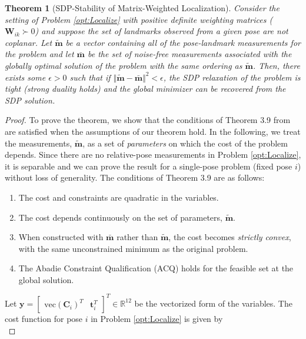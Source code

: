 \documentclass[lettersize,journal]{IEEEtran}
\newcommand{\vect}[1]{\mbox{vec}(#1)}
\newtheorem{theorem}{Theorem}
\begin{document}
\begin{theorem}[SDP-Stability of Matrix-Weighted Localization]
Consider the setting of Problem \eqref{opt:Localize} with positive definite weighting matrices ($ \bm{W}_{ik} \succ 0$) and suppose the set of landmarks observed from a given pose are not coplanar. Let $\tilde{\bm{m}}$ be a vector containing all of the pose-landmark measurements for the problem and let $\bar{\bm{m}}$ be the set of noise-free measurements associated with the globally optimal solution of the problem with the same ordering as $\tilde{\bm{m}}$. Then, there exists some $\epsilon > 0$ such that if $\Vert \tilde{\bm{m}} - \bar{\bm{m}} \Vert^2 < \epsilon $, the SDP relaxation of the problem is tight (strong duality holds) and the global minimizer can be recovered from the SDP solution.
\end{theorem}
\begin{proof}
To prove the theorem, we show that the conditions of Theorem 3.9 from~\cite{cifuentesLocalStabilitySemidefinite2022} are satisfied when the assumptions of our theorem hold. In the following, we treat the measurements, $\tilde{\bm{m}}$, as a set of \emph{parameters} on which the cost of the problem depends. Since there are no relative-pose measurements in Problem \eqref{opt:Localize}, it is separable and we can prove the result for a single-pose problem (fixed pose $i$) without loss of generality.
The conditions of Theorem 3.9 are as follows:
\begin{enumerate}
	\item The cost and constraints are quadratic in the variables. \label{thm1:cond1}
	\item The cost depends continuously on the set of parameters, $\tilde{\bm{m}}$. \label{thm1:cond2}
	\item When constructed with $\bar{\bm{m}}$ rather than $\tilde{\bm{m}}$, the cost becomes \emph{strictly convex}, with the same unconstrained minimum as the original problem.\label{thm1:cond3}
	\item The Abadie Constraint Qualification (ACQ) holds for the feasible set at the global solution. \label{thm1:cond4}
\end{enumerate}
Let $\bm{y} = \begin{bmatrix}\vect{\bm{C}_i}^T & \bm{t}_i^T \end{bmatrix}^T \in\mathbb{R}^{12}$ be the vectorized form of the variables.
The cost function for pose $i$ in Problem \eqref{opt:Localize} is given by 
\begin{equation}\label{eqn:LocCost}

\end{equation}
\end{proof}
\end{document}
